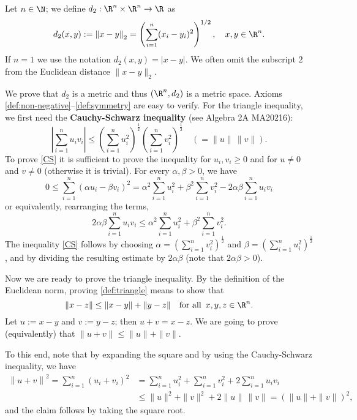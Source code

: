 \begin{example} \label{Eucl:d2}
Let $n \in \N$; we define $d_2 : \R^n \times \R^n \to \R$ as
\[
d_2(x,y):= \left\|x - y\right\|_2 = \left(\sum_{i = 1}^n (x_i - y_i)^2\right)^{1/2}, \quad x,y \in \R^n.
\]%
If $n=1$ we use the notation $d_2(x,y) = |x-y|$. We often omit the subscript $2$ from the Euclidean distance $\|x-y\|_2$.

We prove that $d_2$ is a metric and thus $(\R^n,d_2)$ is a metric space. Axioms \eqref{def:non-negative}--\eqref{def:symmetry}
are easy to verify. For the triangle inequality, we first need the \textbf{Cauchy-Schwarz inequality} (see Algebra 2A MA20216):
\begin{equation}\label{CS}
 \left|\sum_{i=1}^n u_i v_i \right| \leq \left(\sum_{i=1}^n u_i^2\right)^{\frac12} \left(\sum_{i=1}^n v_i^2\right)^{\frac12} \quad (=\|u\|\, \|v\|).
\end{equation}%
To prove \eqref{CS} it is sufficient to prove the inequality for $u_i, v_i\geq 0$ and for $u\neq 0$ and $v\neq 0$ (otherwise it is trivial).
For every $\alpha,\beta>0$, we have
$$
0\leq \sum_{i=1}^n (\alpha u_i - \beta v_i)^2 = \alpha^2 \sum_{i=1}^n u_i^2 + \beta^2 \sum_{i=1}^n v_i^2 - 2\alpha\beta \sum_{i=1}^n u_i v_i 
$$
or equivalently, rearranging the terms,
$$
2\alpha\beta \sum_{i=1}^n u_i v_i  \leq \alpha^2 \sum_{i=1}^n u_i^2 + \beta^2 \sum_{i=1}^n v_i^2.
$$
The inequality \eqref{CS} follows by choosing $\alpha = \left(\sum_{i=1}^n v_i^2\right)^{\frac12}$ and $\beta = \left(\sum_{i=1}^n u_i^2\right)^{\frac12}$, 
and by dividing the resulting estimate by $2\alpha\beta$ (note that $2\alpha\beta> 0$).

\medskip

Now we are ready to prove the triangle inequality. By the definition of the Euclidean norm, proving \eqref{def:triangle} means to show that 
$$
\|x-z\| \leq \|x-y\| + \|y-z\| \quad \textrm{for all } \, x,y,z\in \R^n.
$$
Let $u:=x-y$ and $v:=y-z$; then $u+v=x-z$. We are going to prove (equivalently) that $\|u+v\| \leq \|u\| + \|v\|$. 

To this end, note that by expanding the square and by using the Cauchy-Schwarz inequality, we have 
\begin{align*}
\left\|u+v\right\|^2 = \sum_{i=1}^n  (u_i + v_i)^2 &= \sum_{i=1}^n  u_i^2 + \sum_{i=1}^n  v_i^2 + 2\sum_{i=1}^n u_i v_i 
\\&\leq 
\|u\|^2 + \|v\|^2 + 2 \|u\|\, \|v\| = (\|u\|+\|v\|)^2,
\end{align*}%
and the claim follows by taking the square root.
\end{example}

